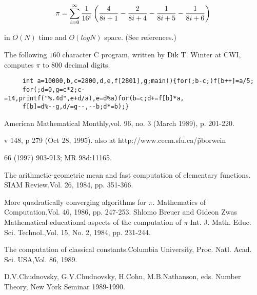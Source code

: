 \[ \pi = \sum_{i=0}^\infty {1 \over 16^i} \left(
    {4 \over 8i+1} - {2 \over 8i+4} - {1 \over 8i+5} - {1 \over 8i+6}
\right)
\]

in $O(N)$ time and $O(log N)$ space. (See references.)


     The
     following $160$ character C program, written by Dik T. Winter at CWI,
     computes $\pi$ to 800 decimal digits.

     \begin{verbatim}
     int a=10000,b,c=2800,d,e,f[2801],g;main(){for(;b-c;)f[b++]=a/5;
     for(;d=0,g=c*2;c-=14,printf("%.4d",e+d/a),e=d%a)for(b=c;d+=f[b]*a,
     f[b]=d%--g,d/=g--,--b;d*=b);}
     \end{verbatim}



\Ref

     {American Mathematical
    Monthly,}{vol. 96, no. 3 (March 1989), p. 201-220.}

     {v 148, p 279 (Oct 28, 1995).
    also at http://www.cecm.sfu.ca/\~pborwein }

{ 66 (1997) 903-913; MR 98d:11165.}


    {The arithmetic-geometric mean and fast computation of elementary
    functions.}
    {SIAM Review,}{Vol. 26, 1984, pp. 351-366.}

    {More quadratically converging algorithms for $\pi$.}
    {Mathematics of Computation,}{Vol. 46, 1986, pp. 247-253.}
   \article
    {Shlomo Breuer and Gideon Zwas}
    {Mathematical-educational aspects of the computation of $\pi$}
    {Int. J. Math. Educ. Sci. Technol.,}{Vol. 15, No. 2, 1984,
    pp. 231-244.}

    {The computation of classical constants.}{Columbia University,
    Proc. Natl. Acad. Sci. USA,}{Vol. 86, 1989.}

    {D.V.Chudnovsky, G.V.Chudnovsky, H.Cohn, M.B.Nathanson, eds.}
    {Number Theory, New York Seminar 1989-1990.}

